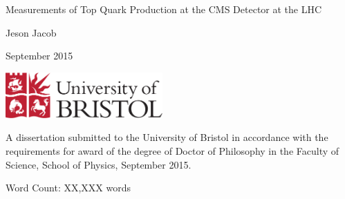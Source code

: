 \begin{titlepage}
	
	\begin{center}
		
		\vspace*{1cm}
		
		\Huge
		
		Measurements of Top Quark Production at the CMS Detector at the LHC

		\vspace{0.5cm}
		
		\large
		
		Jeson Jacob
		
		\vspace{0.5cm}
		
		September 2015 %
		
		\vspace{0.5cm}
		
		\includegraphics[width=60mm]{Images/UnivShield}
		
		\vfill
		
		\normalsize
	\end{center}
	A dissertation submitted to the University of Bristol in accordance with the
	requirements for award of the degree of Doctor of Philosophy in the Faculty of
	Science, School of Physics, September 2015.

	\begin{flushright}
		Word Count: XX,XXX words
	\end{flushright}

\end{titlepage}